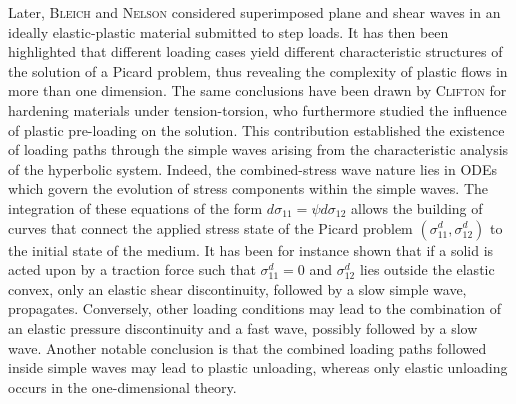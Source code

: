 Later, \textsc{Bleich} and \textsc{Nelson} \cite{Bleich} considered superimposed plane and shear waves in an ideally elastic-plastic material submitted to step loads.
It has then been highlighted that different loading cases yield different characteristic structures of the solution of a Picard problem, thus revealing the complexity of plastic flows in more than one dimension.
The same conclusions have been drawn by \textsc{Clifton} \cite{Clifton} for hardening materials under tension-torsion, who furthermore studied the influence of plastic pre-loading on the solution.
This contribution established the existence of loading paths through the simple waves arising from the characteristic analysis of the hyperbolic system.
Indeed, the combined-stress wave nature lies in ODEs which govern the evolution of stress components within the simple waves.
The integration of these equations of the form $d\sigma_{11}=\psi d\sigma_{12}$ allows the building of curves that connect the applied stress state of the Picard problem $(\sigma^d_{11},\sigma^d_{12})$ to the initial state of the medium.
It has been for instance shown that if a solid is acted upon by a traction force such that $\sigma^d_{11}=0$ and $\sigma^d_{12}$ lies outside the elastic convex, only an elastic shear discontinuity, followed by a slow simple wave, propagates.
Conversely, other loading conditions may lead to the combination of an elastic pressure discontinuity and a fast wave, possibly followed by a slow wave.
Another notable conclusion is that the combined loading paths followed inside simple waves may lead to plastic unloading, whereas only elastic unloading occurs in the one-dimensional theory.

